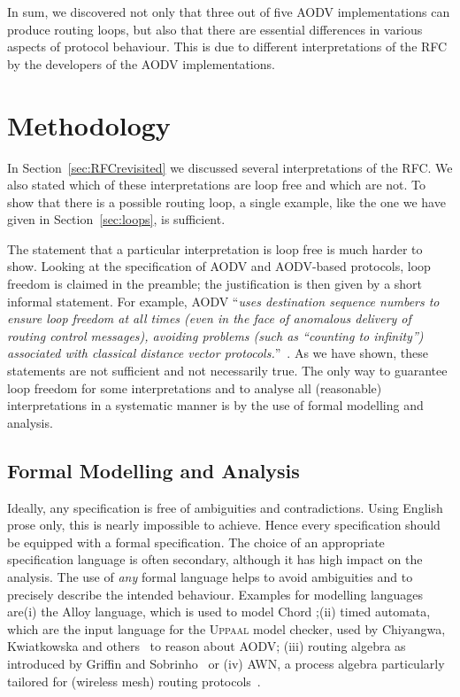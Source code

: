 \documentclass[letterpaper]{sig-alternate-pages}
\newcommand{\uppaal}{\textsc{Uppaal}}
\renewcommand{\sf}{\it}
\begin{document}
In sum, we discovered not only that three out of five AODV implementations can produce routing loops, 
but also that there are essential differences in various aspects of protocol behaviour. 
This is due to different interpretations of the RFC by the developers of the AODV implementations.

\section{Methodology}\label{sec:methodology}

In Section~\ref{sec:RFCrevisited} we discussed several interpretations of the RFC\@. 
We also stated which of these interpretations are loop free and which are not.
To show that there is a possible routing loop, a single example, like the one we have given in 
Section~\ref{sec:loops}, is sufficient. 


The statement that a particular interpretation is loop free is much harder to show. 
Looking at the specification of AODV and AODV-based protocols,
loop freedom is claimed in the preamble; 
the justification is then given by a short informal statement. For example, AODV
``{\sf uses
   destination sequence numbers to ensure loop freedom at all times
   (even in the face of anomalous delivery of routing control messages),
   avoiding problems (such as ``counting to infinity'') associated with
   classical distance vector protocols.\/}''~\cite[Sect.~1]{rfc3561}.
As we have shown, these statements 
are not sufficient and not necessarily true.
The only way to guarantee loop freedom for some interpretations and to analyse 
all (reasonable) interpretations in a systematic manner is by the use of formal modelling and analysis. 


\subsection{Formal Modelling and Analysis}
Ideally, any specification is free of ambiguities and contradictions. Using English prose only, this is nearly impossible to achieve. 
Hence every specification should be equipped with a formal specification. 
The choice of an appropriate specification language is often secondary, although it has high impact on the analysis. 
The use of {\em any} formal language helps to avoid ambiguities and to precisely describe the intended behaviour. 
Examples for modelling languages are\linebreak[3]
(i) the Alloy language, which is used to model Chord \cite{Zave12};\linebreak[2]
(ii) timed automata, which are the input language for the {\uppaal}
model checker, used by Chiyangwa, Kwiatkowska \cite{CK05} and others~\cite{TACAS12} to reason about AODV;
(iii) routing algebra as introduced by Griffin and Sobrinho~\cite{GS05}
or (iv) AWN, a process algebra particularly tailored for (wireless mesh) routing protocols~\cite{ESOP12,MSWIM12}.
\end{document}
